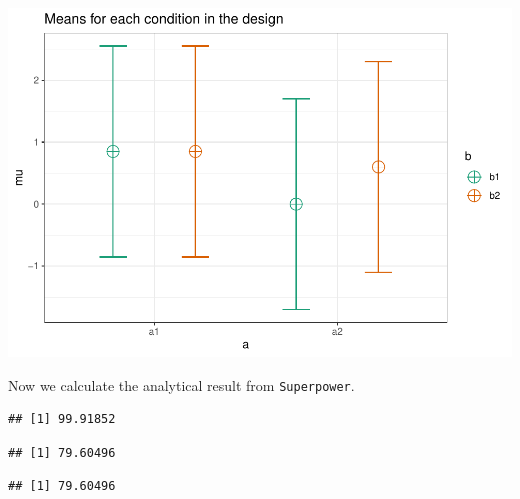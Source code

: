 \documentclass[
]{book}
\newenvironment{Shaded}{\begin{snugshade}}{\end{snugshade}}
\newcommand{\KeywordTok}[1]{\textcolor[rgb]{0.13,0.29,0.53}{\textbf{#1}}}
\newcommand{\NormalTok}[1]{#1}
\newcommand{\OperatorTok}[1]{\textcolor[rgb]{0.81,0.36,0.00}{\textbf{#1}}}
\newcommand{\StringTok}[1]{\textcolor[rgb]{0.31,0.60,0.02}{#1}}
\begin{document}
\includegraphics{SuperpowerValidation_files/figure-latex/aberson_5.3-1.pdf}

Now we calculate the analytical result from \texttt{Superpower}.

\begin{Shaded}
\end{Shaded}

\begin{verbatim}
## [1] 99.91852
\end{verbatim}

\begin{Shaded}
\end{Shaded}

\begin{verbatim}
## [1] 79.60496
\end{verbatim}

\begin{Shaded}
\end{Shaded}

\begin{verbatim}
## [1] 79.60496
\end{verbatim}
\end{document}
